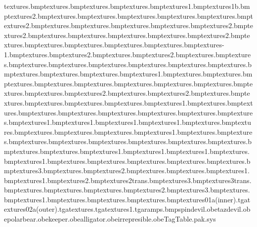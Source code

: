 textures\anvilbuttons.bmp textures\anvilcannister.bmp textures\anvileye.bmp textures\anvilfingers.bmp textures\anvilgun1.bmp textures\anvilgun1b.bmp textures\anvilgun2.bmp textures\anvillogo.bmp textures\anvilshoulder.bmp textures\anvilstrap.bmp textures\anviltache.bmp textures\bodyeyebrow.bmp textures\bodytoes2.bmp textures\catchercollarl.bmp textures\catchercollarr.bmp textures\catchereye.bmp textures\catcherhat.bmp textures\daffynostril2.bmp textures\earslined2.bmp textures\elephanteye.bmp textures\elephanttoes.bmp textures\elephantwrinkles.bmp textures\eyetex.bmp textures\eyetex2.bmp textures\eyetextweety.bmp textures\fuddcap.bmp textures\fuddmike.bmp textures\fuddshoe.bmp textures\fuddstripes.bmp textures\fuddwhistlebit-1.bmp textures\gossfinger.bmp textures\gossshoe2.bmp textures\hammerlogo.bmp textures\keeperbutton2.bmp textures\keepercollar.bmp textures\keepereye.bmp textures\keeperfingers.bmp textures\keeperhat.bmp textures\keepertache.bmp textures\muzzlestubble.bmp textures\noseshine.bmp textures\pbeye.bmp textures\pbmouth.bmp textures\pbnose.bmp textures\pbteeth.bmp textures\shedevilbracelet1.bmp textures\sylvesterfuredge.bmp textures\taskforcebelt.bmp textures\taskforcecollar.bmp textures\taskforcecuffs.bmp textures\tazforceshield.bmp textures\tsamankles.bmp textures\tsambutton.bmp textures\tsamcollar.bmp textures\tsamteeth.bmp textures\tsamtie.bmp textures\tweetybrow2.bmp textures\wileeeyeball.bmp textures\wileenosebridge2.bmp textures\crback.bmp textures\creye.bmp textures\crmouth.bmp textures\crnose.bmp textures\crtooth.bmp textures\baseballlogo1.bmp textures\black.bmp textures\bluebucket.bmp textures\bluetrousers.bmp textures\body.bmp textures\bodytoes.bmp textures\brownboots.bmp textures\brownhair.bmp textures\brownsoles.bmp textures\cameraflash1.bmp textures\camerafront1.bmp textures\cameralens1.bmp textures\cameralensaround1.bmp textures\cowboyhatstar.bmp textures\daffybill.bmp textures\daffyinmouth.bmp textures\ears.bmp textures\earslined.bmp textures\flesh1.bmp textures\fuddboots.bmp textures\fuddgunbarrel.bmp textures\fuddhatred.bmp textures\fuddmouth.bmp textures\fuddskin.bmp textures\fuddsuit.bmp textures\fuddtongue.bmp textures\indyhatband.bmp textures\keepernettrans.bmp textures\limbtrans.bmp textures\minelamp1.bmp textures\monkeychest1.bmp textures\monkeyface1.bmp textures\monkeyfingers.bmp textures\monkeyhand1.bmp textures\mouth.bmp textures\mouthhole.bmp textures\muzzle.bmp textures\nose.bmp textures\piratehat.bmp textures\eyetex3.bmp textures\safarimonacle.bmp textures\safhat2.bmp textures\scubatube.bmp textures\shadesshine.bmp textures\shortz1.bmp textures\spin1.bmp textures\spin2.bmp textures\spin2trans.bmp textures\spin3.bmp textures\spin3trans.bmp textures\teeth.bmp textures\tongue.bmp textures\tongueline.bmp textures\tongueline2.bmp textures\tongueline3.bmp textures\watchbuttons.bmp textures\watchfront1.bmp textures\white.bmp textures\whiteshirt.bmp textures\ramps.bmp textures\spin01a(inner).tga textures\spin02a(outer).tga textures\taskforcegloveextend.tga textures\taskforcevisor1.tga ramps.bmp spindevil.obe tazdevil.obe polarbear.obe keeper.obe alligator.obe irrepresible.obe TagTable.pak.sys 